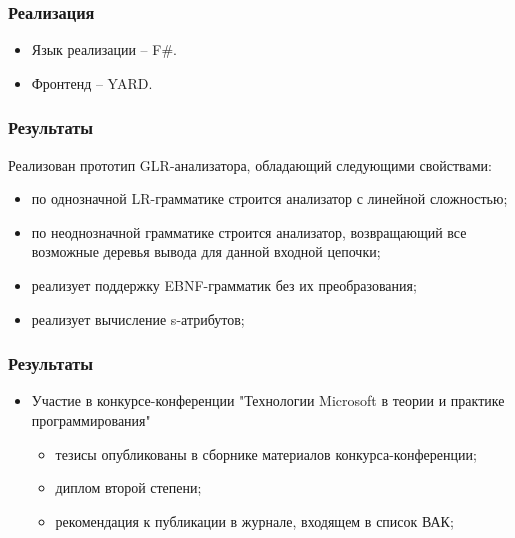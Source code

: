 \documentclass{beamer}
\begin{document}
\begin{frame}
	\transwipe[direction=90]
	\frametitle{Реализация}
	\begin{itemize}
		\item Язык реализации -- F\#.
    \item Фронтенд -- YARD.   
	\end{itemize}	
\end{frame}


\begin{frame}
	\transwipe[direction=90]
	\frametitle{Результаты}
	Реализован прототип GLR-анализатора, обладающий следующими свойствами:
	\begin{itemize}
		\item по однозначной LR-грамматике строится анализатор с линейной сложностью;
    \item по неоднозначной грамматике строится анализатор, возвращающий все возможные деревья вывода для данной входной цепочки;
    \item реализует поддержку EBNF-грамматик без их преобразования;
    \item реализует вычисление s-атрибутов;
	\end{itemize}	
\end{frame}

\begin{frame}
	\transwipe[direction=90]
	\frametitle{Результаты}
\begin{itemize}
	\item  Участие в конкурсе-конференции "Технологии Microsoft в теории и практике программирования"
	\begin{itemize}
		\item тезисы опубликованы в сборнике материалов конкурса-конференции;
    \item диплом второй степени;
    \item рекомендация к публикации в журнале, входящем в список ВАК;
	\end{itemize}	
\end{itemize}	
\end{frame}
\end{document}
